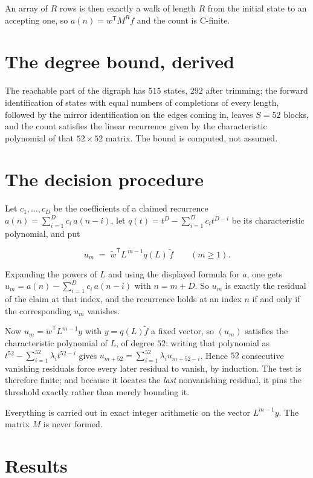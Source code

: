 \documentclass[11pt]{article}
\theoremstyle{definition}
\begin{document}
An array of $R$ rows is then exactly a walk of length $R$ from the initial state to an accepting one, so $a(n) = w^{\mathsf T}M^{R}f$ and the count is C-finite.

\section{The degree bound, derived}

The reachable part of the digraph has $515$ states, $292$ after trimming; the forward identification of states with equal numbers of completions of every length, followed by the mirror identification on the edges coming in, leaves $S = 52$ blocks, and the count satisfies the linear recurrence given by the characteristic polynomial of that $52\times52$ matrix. The bound is computed, not assumed.

\section{The decision procedure}

Let $c_1,\dots,c_D$ be the coefficients of a claimed recurrence $a(n) = \sum_{i=1}^{D} c_i\,a(n-i)$, let $q(t) = t^{D} - \sum_{i=1}^{D} c_i t^{D-i}$ be its characteristic polynomial, and put

\[u_m \;=\; \tilde w^{\mathsf T} L^{\,m-1} q(L)\,\tilde f \qquad (m \ge 1).\]

Expanding the powers of $L$ and using the displayed formula for $a$, one gets $u_m = a(n) - \sum_{i=1}^{D} c_i\,a(n-i)$ with $n = m + D$. So $u_m$ is exactly the residual of the claim at that index, and the recurrence holds at an index $n$ if and only if the corresponding $u_m$ vanishes.

Now $u_m = \tilde w^{\mathsf T} L^{m-1} y$ with $y = q(L)\tilde f$ a fixed vector, so $(u_m)$ satisfies the characteristic polynomial of $L$, of degree $52$: writing that polynomial as $t^{52} - \sum_{i=1}^{52} \lambda_i t^{52-i}$ gives $u_{m+52} = \sum_{i=1}^{52} \lambda_i u_{m+52-i}$. Hence $52$ consecutive vanishing residuals force every later residual to vanish, by induction. The test is therefore finite; and because it locates the {\itshape last} nonvanishing residual, it pins the threshold exactly rather than merely bounding it.

Everything is carried out in exact integer arithmetic on the vector $L^{m-1}y$. The matrix $M$ is never formed.

\section{Results}
\end{document}
